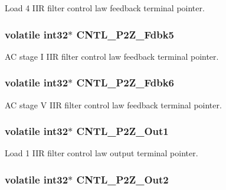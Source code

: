 Load 4 I\-I\-R filter control law feedback terminal pointer. \hypertarget{a00014_af5cbb635f31bbebd041e8543deb40dee}{
\subsubsection[{C\-N\-T\-L\-\_\-2\-P2\-Z\-\_\-\-Fdbk5}]{\setlength{\rightskip}{0pt plus 5cm}volatile int32$\ast$ C\-N\-T\-L\-\_\-P2\-Z\-\_\-\-Fdbk5}}\label{a00014_af5cbb635f31bbebd041e8543deb40dee}
A\-C stage I I\-I\-R filter control law feedback terminal pointer. \hypertarget{a00014_a1ce5f290e8eb4fd89ae9787e7020e062}{
\subsubsection[{C\-N\-T\-L\-\_\-2\-P2\-Z\-\_\-\-Fdbk6}]{\setlength{\rightskip}{0pt plus 5cm}volatile int32$\ast$ C\-N\-T\-L\-\_\-P2\-Z\-\_\-\-Fdbk6}}\label{a00014_a1ce5f290e8eb4fd89ae9787e7020e062}
A\-C stage V I\-I\-R filter control law feedback terminal pointer. \hypertarget{a00014_a84d7c096ca668d1edc5e4fa54abe5d98}{
\subsubsection[{C\-N\-T\-L\-\_\-2\-P2\-Z\-\_\-\-Out1}]{\setlength{\rightskip}{0pt plus 5cm}volatile int32$\ast$ C\-N\-T\-L\-\_\-P2\-Z\-\_\-\-Out1}}\label{a00014_a84d7c096ca668d1edc5e4fa54abe5d98}
Load 1 I\-I\-R filter control law output terminal pointer. \hypertarget{a00014_ae6679b66ffeca93742f973a2c947855f}{
\subsubsection[{C\-N\-T\-L\-\_\-2\-P2\-Z\-\_\-\-Out2}]{\setlength{\rightskip}{0pt plus 5cm}volatile int32$\ast$ C\-N\-T\-L\-\_\-P2\-Z\-\_\-\-Out2}}\label{a00014_ae6679b66ffeca93742f973a2c947855f}
